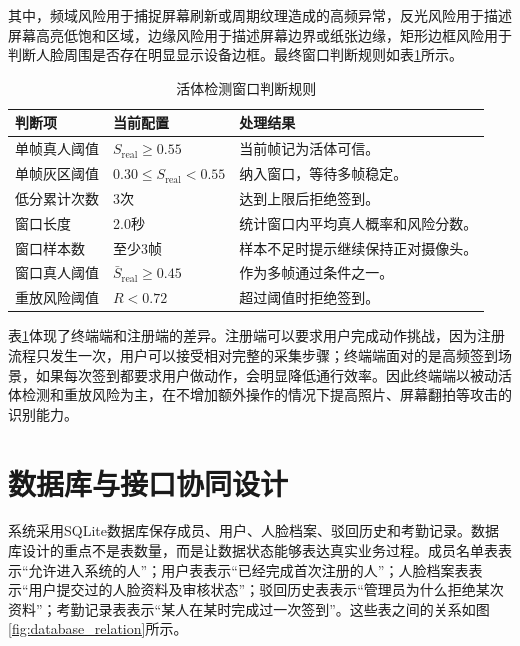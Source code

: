 其中，频域风险用于捕捉屏幕刷新或周期纹理造成的高频异常，反光风险用于描述屏幕高亮低饱和区域，边缘风险用于描述屏幕边界或纸张边缘，矩形边框风险用于判断人脸周围是否存在明显显示设备边框。最终窗口判断规则如表\ref{tab:liveness_rule}所示。

\begin{table}[H]
    \centering
    \caption{活体检测窗口判断规则}
    \label{tab:liveness_rule}
    \begin{tabularx}{\textwidth}{p{4cm}p{4cm}X}
        \toprule
        \textbf{判断项} & \textbf{当前配置} & \textbf{处理结果} \\
        \midrule
        单帧真人阈值 & $S_{\text{real}}\geq0.55$ & 当前帧记为活体可信。 \\
        单帧灰区阈值 & $0.30\leq S_{\text{real}}<0.55$ & 纳入窗口，等待多帧稳定。 \\
        低分累计次数 & 3次 & 达到上限后拒绝签到。 \\
        窗口长度 & 2.0秒 & 统计窗口内平均真人概率和风险分数。 \\
        窗口样本数 & 至少3帧 & 样本不足时提示继续保持正对摄像头。 \\
        窗口真人阈值 & $\bar{S}_{\text{real}}\geq0.45$ & 作为多帧通过条件之一。 \\
        重放风险阈值 & $R<0.72$ & 超过阈值时拒绝签到。 \\
        \bottomrule
    \end{tabularx}
\end{table}

表\ref{tab:liveness_rule}体现了终端端和注册端的差异。注册端可以要求用户完成动作挑战，因为注册流程只发生一次，用户可以接受相对完整的采集步骤；终端端面对的是高频签到场景，如果每次签到都要求用户做动作，会明显降低通行效率。因此终端端以被动活体检测和重放风险为主，在不增加额外操作的情况下提高照片、屏幕翻拍等攻击的识别能力。

\section{数据库与接口协同设计}

系统采用SQLite数据库\cite{sqlite}保存成员、用户、人脸档案、驳回历史和考勤记录。数据库设计的重点不是表数量，而是让数据状态能够表达真实业务过程。成员名单表表示“允许进入系统的人”；用户表表示“已经完成首次注册的人”；人脸档案表表示“用户提交过的人脸资料及审核状态”；驳回历史表表示“管理员为什么拒绝某次资料”；考勤记录表表示“某人在某时完成过一次签到”。这些表之间的关系如图\ref{fig:database_relation}所示。

